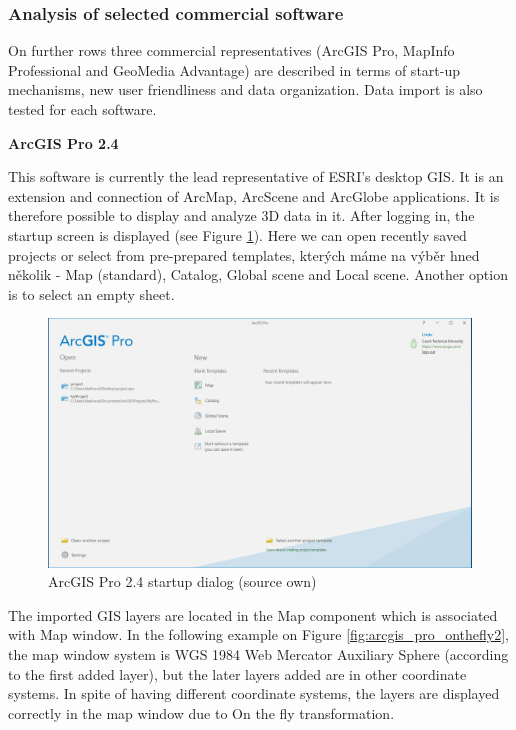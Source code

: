 \documentclass[a4paper,10pt,twoside]{article}
\begin{document}
\subsubsection{Analysis of selected commercial software}

\noindent On further rows three commercial representatives (ArcGIS Pro, MapInfo Professional and GeoMedia Advantage) are described in terms of start-up mechanisms, new user friendliness and data organization. Data import is also tested for each software. 

\bigskip

\noindent \textbf {ArcGIS Pro 2.4}

\noindent This software is currently the lead representative of ESRI's desktop GIS. It is an extension and connection of ArcMap, ArcScene and ArcGlobe applications. It is therefore possible to display and analyze 3D data in it. After logging in, the startup screen is displayed (see Figure \ref{fig:arcgis_startup_screen}). Here we can open recently saved projects or select from pre-prepared templates, kterých máme na výběr hned několik - Map (standard), Catalog, Global scene and Local scene. Another option is to select an empty sheet.

\vspace{0.3cm}
\begin{figure}[hbt!] 
\begin{center}
\includegraphics[width=16cm]{../pictures/arcgis_startup_screen.png} 
\caption[ArcGIS Pro 2.4 startup dialog (source own)]{ArcGIS Pro 2.4 startup dialog (source own)}
\label{fig:arcgis_startup_screen}
\end{center}
\end{figure}

\noindent The imported GIS layers are located in the Map component which is associated with Map window. In the following example on Figure \ref{fig:arcgis_pro_onthefly2}, the map window system is WGS 1984 Web Mercator Auxiliary Sphere (according to the first added layer), but the later layers added are in other coordinate systems. In spite of having different coordinate systems, the layers are displayed correctly in the map window due to On the fly transformation.
\end{document}
